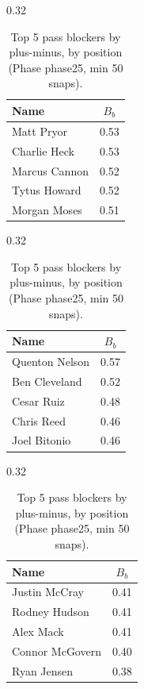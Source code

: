 \begin{table}[h!]
\centering
\begin{subtable}{0.32\textwidth}
\centering
\footnotesize
\begin{tabular}{lc}
\toprule
Name & $B_b$ \\
\midrule
Matt Pryor & 0.53 \\
Charlie Heck & 0.53 \\
Marcus Cannon & 0.52 \\
Tytus Howard & 0.52 \\
Morgan Moses & 0.51 \\
\bottomrule
\end{tabular}
\caption{T}
\end{subtable}
\hfill
\begin{subtable}{0.32\textwidth}
\centering
\footnotesize
\begin{tabular}{lc}
\toprule
Name & $B_b$ \\
\midrule
Quenton Nelson & 0.57 \\
Ben Cleveland & 0.52 \\
Cesar Ruiz & 0.48 \\
Chris Reed & 0.46 \\
Joel Bitonio & 0.46 \\
\bottomrule
\end{tabular}
\caption{G}
\end{subtable}
\hfill
\begin{subtable}{0.32\textwidth}
\centering
\footnotesize
\begin{tabular}{lc}
\toprule
Name & $B_b$ \\
\midrule
Justin McCray & 0.41 \\
Rodney Hudson & 0.41 \\
Alex Mack & 0.41 \\
Connor McGovern & 0.40 \\
Ryan Jensen & 0.38 \\
\bottomrule
\end{tabular}
\caption{C}
\end{subtable}
\caption{Top 5 pass blockers by plus-minus, by position (Phase phase25, min 50 snaps).}
\label{tab:blocker_pm_phase25_top}
\end{table}

